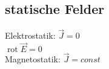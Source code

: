 \subsection{statische Felder}
Elektrostatik: $\vec{J} = 0$\\
$\operatorname{rot} \vec{E} = 0$\\
Magnetostatik: $\vec{J} = const$